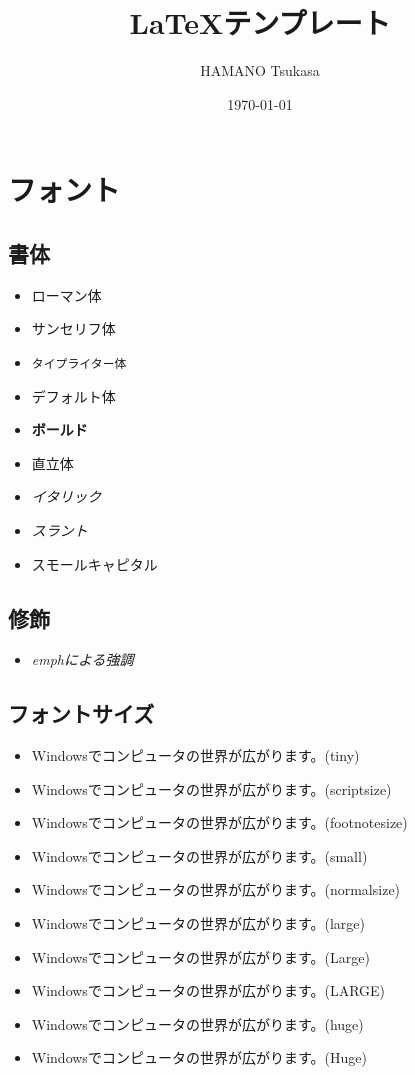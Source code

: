 \documentclass[a4paper,onecolumn,12pt]{jsarticle}
\title{\LaTeX テンプレート}
\author{HAMANO Tsukasa}
\date{\today}
\begin{document}
\maketitle
\vspace{1em}
\tableofcontents
\clearpage

\section{フォント}
\subsection{書体}
\begin{itemize}
\item \textrm{ローマン体}
\item \textsf{サンセリフ体}
\item \texttt{タイプライター体}
\item \textmd{デフォルト体}
\item \textbf{ボールド}
\item \textup{直立体}
\item \textit{イタリック}
\item \textsl{スラント}
\item \textsc{スモールキャピタル}
\end{itemize}

\subsection{修飾}
\begin{itemize}
\item \emph{emphによる強調}
\end{itemize}

\def\sampletext{Windowsでコンピュータの世界が広がります。}

\subsection{フォントサイズ}
\begin{itemize}
  \normalsize\item\tiny{\sampletext(tiny)}
  \normalsize\item\scriptsize{\sampletext(scriptsize)}
  \normalsize\item\footnotesize{\sampletext(footnotesize)}
  \normalsize\item\small{\sampletext(small)}
  \normalsize\item\normalsize{\sampletext(normalsize)}
  \normalsize\item\large{\sampletext(large)}
  \normalsize\item\Large{\sampletext(Large)}
  \normalsize\item\LARGE{\sampletext(LARGE)}
  \normalsize\item\huge{\sampletext(huge)}
  \normalsize\item\Huge{\sampletext(Huge)}
\end{itemize}
\normalsize
\end{document}
